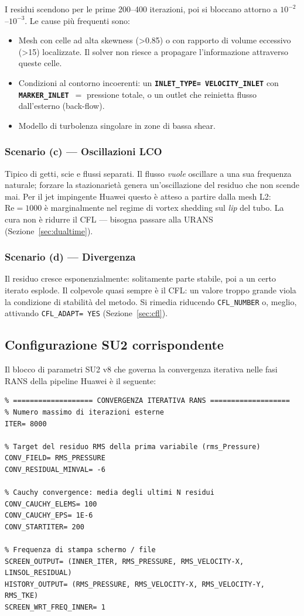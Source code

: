 \documentclass[11pt,a4paper]{article}
\newcommand{\ttcfg}[1]{\texttt{\color{codegray}#1}}
\newcommand{\kw}[1]{\texttt{\color{keywordcolor}\bfseries #1}}
\newcommand{\Rey}{\mathrm{Re}}
\begin{document}
I residui scendono per le prime 200--400 iterazioni, poi si bloccano
attorno a $10^{-2}$--$10^{-3}$. Le cause più frequenti sono:
\begin{itemize}
  \item Mesh con celle ad alta skewness (>0.85) o con rapporto di
    volume eccessivo (>15) localizzate. Il solver non riesce a
    propagare l'informazione attraverso queste celle.
  \item Condizioni al contorno incoerenti: un \kw{INLET\_TYPE=
    VELOCITY\_INLET} con \kw{MARKER\_INLET}~$=$ pressione totale, o un
    outlet che reinietta flusso dall'esterno (back-flow).
  \item Modello di turbolenza singolare in zone di bassa shear.
\end{itemize}

\subsubsection*{Scenario (c) — Oscillazioni LCO}

Tipico di getti, scie e flussi separati. Il flusso \emph{vuole}
oscillare a una sua frequenza naturale; forzare la stazionarietà
genera un'oscillazione del residuo che non scende mai. Per il jet
impingente Huawei questo è atteso a partire dalla mesh L2:
$\Rey=1000$ è marginalmente nel regime di vortex shedding sul
\emph{lip} del tubo. La cura non è ridurre il CFL — bisogna passare
alla URANS (Sezione~\ref{sec:dualtime}).

\subsubsection*{Scenario (d) — Divergenza}

Il residuo cresce esponenzialmente: solitamente parte stabile,
poi a un certo iterato esplode. Il colpevole quasi sempre è il
CFL: un valore troppo grande viola la condizione di stabilità del
metodo. Si rimedia riducendo \ttcfg{CFL\_NUMBER} o, meglio,
attivando \ttcfg{CFL\_ADAPT= YES} (Sezione~\ref{sec:cfl}).

\subsection{Configurazione SU2 corrispondente}

Il blocco di parametri SU2 v8 che governa la convergenza iterativa
nelle fasi RANS della pipeline Huawei è il seguente:

\begin{lstlisting}
% =================== CONVERGENZA ITERATIVA RANS ===================
% Numero massimo di iterazioni esterne
ITER= 8000

% Target del residuo RMS della prima variabile (rms_Pressure)
CONV_FIELD= RMS_PRESSURE
CONV_RESIDUAL_MINVAL= -6

% Cauchy convergence: media degli ultimi N residui
CONV_CAUCHY_ELEMS= 100
CONV_CAUCHY_EPS= 1E-6
CONV_STARTITER= 200

% Frequenza di stampa schermo / file
SCREEN_OUTPUT= (INNER_ITER, RMS_PRESSURE, RMS_VELOCITY-X, LINSOL_RESIDUAL)
HISTORY_OUTPUT= (RMS_PRESSURE, RMS_VELOCITY-X, RMS_VELOCITY-Y, RMS_TKE)
SCREEN_WRT_FREQ_INNER= 1
\end{lstlisting}
\end{document}

